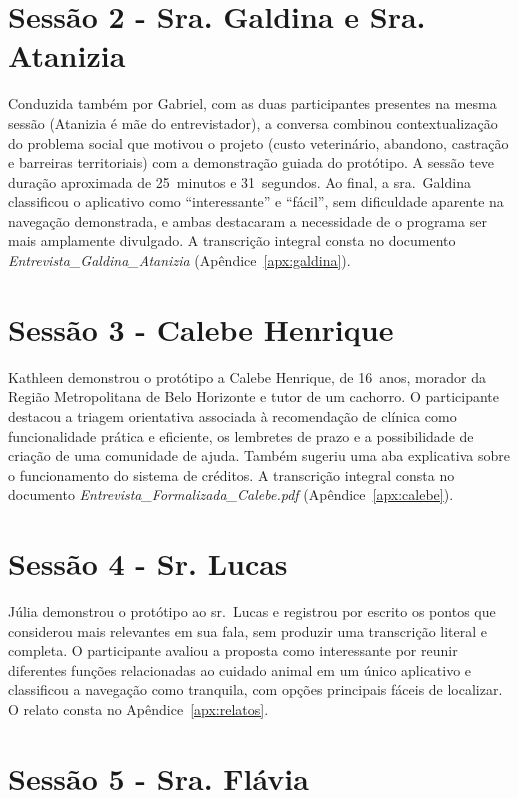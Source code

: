 \documentclass[
    12pt,
    openright,
    oneside,
    a4paper
]{abntex2}
\begin{document}
\section{Sessão 2 - Sra. Galdina e Sra. Atanizia}

Conduzida também por Gabriel, com as duas participantes presentes na mesma sessão (Atanizia é
mãe do entrevistador), a conversa combinou contextualização do problema social que motivou o
projeto (custo veterinário, abandono, castração e barreiras territoriais) com a
demonstração guiada do protótipo. A sessão teve duração aproximada de 25~minutos e
31~segundos. Ao final, a sra.~Galdina classificou o aplicativo como \enquote{interessante} e
\enquote{fácil}, sem dificuldade aparente na navegação demonstrada, e ambas destacaram a
necessidade de o programa ser mais amplamente divulgado. A transcrição integral consta no
documento \textit{Entrevista\_Galdina\_Atanizia} (Apêndice~\ref{apx:galdina}).

\section{Sessão 3 - Calebe Henrique}

Kathleen demonstrou o protótipo a Calebe Henrique, de 16~anos, morador da Região Metropolitana
de Belo Horizonte e tutor de um cachorro. O participante destacou a triagem orientativa
associada à recomendação de clínica como funcionalidade prática e eficiente, os lembretes de
prazo e a possibilidade de criação de uma comunidade de ajuda. Também sugeriu uma aba
explicativa sobre o funcionamento do sistema de créditos. A transcrição integral consta no
documento \textit{Entrevista\_Formalizada\_Calebe.pdf}
(Apêndice~\ref{apx:calebe}).

\section{Sessão 4 - Sr. Lucas}

Júlia demonstrou o protótipo ao sr.~Lucas e registrou por escrito os pontos que considerou
mais relevantes em sua fala, sem produzir uma transcrição literal e completa. O participante
avaliou a proposta como interessante por reunir diferentes funções relacionadas ao cuidado
animal em um único aplicativo e classificou a navegação como tranquila, com opções
principais fáceis de localizar. O relato consta no Apêndice~\ref{apx:relatos}.

\section{Sessão 5 - Sra. Flávia}
\end{document}
